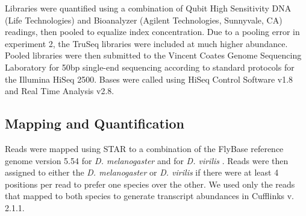 Libraries were quantified using a combination of Qubit High Sensitivity DNA (Life Technologies) and Bioanalyzer (Agilent Technologies, Sunnyvale, CA) readings, then pooled to equalize index concentration. Due to a pooling error in experiment 2, the TruSeq libraries were included at much higher abundance. Pooled libraries were then submitted to the Vincent Coates Genome Sequencing Laboratory for 50bp single-end sequencing according to standard protocols for the Illumina HiSeq 2500. Bases were called using HiSeq Control Software v1.8 and Real Time Analysis v2.8.


\subsection{Mapping and Quantification}


Reads were mapped using STAR \cite{Dobin:2012fg} to a combination of the FlyBase reference genome version 5.54 for {\em D. melanogaster} and for {\em D. virilis} \cite{McQuilton:2011iq}. Reads were then assigned to either the {\em D. melanogaster} or {\em D. virilis} if there were at least 4 positions per read to prefer one species over the other. We used only the reads that mapped to both species to generate transcript abundances in Cufflinks v. 2.1.1\cite{Roberts:2012kp}.
